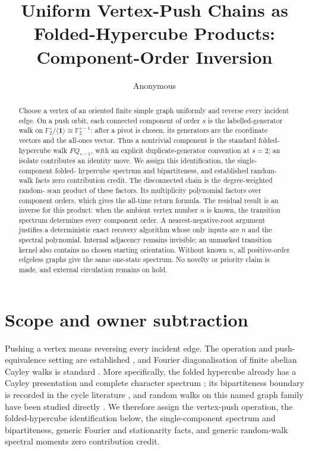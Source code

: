 \documentclass[10pt,a4paper]{amsart}
\title[Vertex-Push Chains as Folded-Hypercube Products]
{Uniform Vertex-Push Chains as Folded-Hypercube Products:\\
Component-Order Inversion}
\author{Anonymous}
\date{}
\theoremstyle{remark}
\newcommand{\F}{\mathbb F}
\newcommand{\one}{\mathbf 1}
\begin{document}
\begin{abstract}
Choose a vertex of an oriented finite simple graph uniformly and reverse every
incident edge.  On a push orbit, each connected component of order $s$ is the
labelled-generator walk on
$\F_2^s/\langle\one\rangle\cong\F_2^{s-1}$: after a pivot is chosen, its
generators are the coordinate vectors and the all-ones vector.  Thus a
nontrivial component is the standard folded-hypercube walk $FQ_{s-1}$, with
an explicit duplicate-generator convention at $s=2$; an isolate contributes
an identity move.  We assign this identification, the single-component folded-
hypercube spectrum and bipartiteness, and established random-walk facts zero
contribution credit.  The disconnected chain is the degree-weighted random-
scan product of these factors.  Its multiplicity polynomial factors over
component orders, which gives the all-time return formula.  The residual
result is an inverse for this product: when the ambient vertex number $n$ is
known, the transition spectrum determines every component order.  A
nearest-negative-root argument justifies a deterministic exact recovery
algorithm whose only inputs are $n$ and the spectral polynomial.  Internal
adjacency remains invisible; an unmarked transition kernel also contains no
chosen starting orientation.  Without known $n$, all positive-order edgeless
graphs give the same one-state spectrum.  No novelty or priority claim is
made, and external circulation remains on hold.
\end{abstract}

\maketitle

\section{Scope and owner subtraction}\label{sec:scope}

Pushing a vertex means reversing every incident edge.  The operation and
push-equivalence setting are established \citep{Pretzel1991,Klostermeyer1999},
and Fourier diagonalisation of finite abelian Cayley walks is standard
\citep{Terras1999}.  More specifically, the folded hypercube already has a
Cayley presentation and complete character spectrum
\citep{XuMeng2009Folded}; its bipartiteness boundary is recorded in the cycle
literature \citep{XuMa2006Cycles}, and random walks on this named graph family
have been studied directly \citep{ChenLiLin2019RandomWalks}.  We therefore
assign the vertex-push operation, the folded-hypercube identification below,
the single-component spectrum and bipartiteness, generic Fourier and
stationarity facts, and generic random-walk spectral moments zero contribution
credit.
\end{document}
